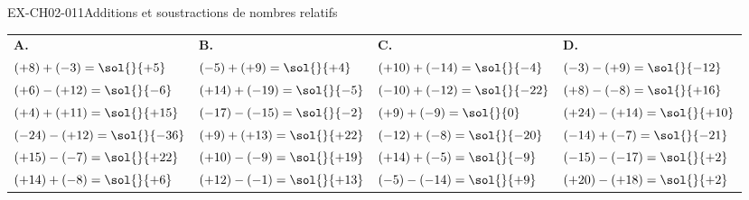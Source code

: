 \begin{exercice}{EX-CH02-011}{Additions et soustractions de nombres relatifs}
{\small
\bigskip
\def\arraystretch{1.7}
\begin{tabularx}{\linewidth}{*{4}{X}}
\textbf{A.} & \textbf{B.} & \textbf{C.} & \textbf{D.} \\
$(+8)+(-3)= \sol{\dotfill}{+5}$   & $(-5)+(+9)= \sol{\dotfill}{+4}$   & $(+10)+(-14)= \sol{\dotfill}{-4}$ & $(-3)-(+9)= \sol{\dotfill}{-12}$   \\
$(+6)-(+12)= \sol{\dotfill}{-6}$  & $(+14)+(-19)= \sol{\dotfill}{-5}$ & $(-10)+(-12)= \sol{\dotfill}{-22}$ & $(+8)-(-8)= \sol{\dotfill}{+16}$   \\
$(+4)+(+11)= \sol{\dotfill}{+15}$  & $(-17)-(-15)= \sol{\dotfill}{-2}$ & $(+9)+(-9)= \sol{\dotfill}{0}$   & $(+24)-(+14)= \sol{\dotfill}{+10}$ \\
$(-24)-(+12)= \sol{\dotfill}{-36}$ & $(+9)+(+13)= \sol{\dotfill}{+22}$  & $(-12)+(-8)= \sol{\dotfill}{-20}$  & $(-14)+(-7)= \sol{\dotfill}{-21}$  \\
$(+15)-(-7)= \sol{\dotfill}{+22}$  & $(+10)-(-9)= \sol{\dotfill}{+19}$  & $(+14)+(-5)= \sol{\dotfill}{-9}$  & $(-15)-(-17)= \sol{\dotfill}{+2}$ \\
$(+14)+(-8)= \sol{\dotfill}{+6}$  & $(+12)-(-1)= \sol{\dotfill}{+13}$  & $(-5)-(-14)= \sol{\dotfill}{+9}$  & $(+20)-(+18)= \sol{\dotfill}{+2}$ \\
\end{tabularx}
}
\end{exercice}